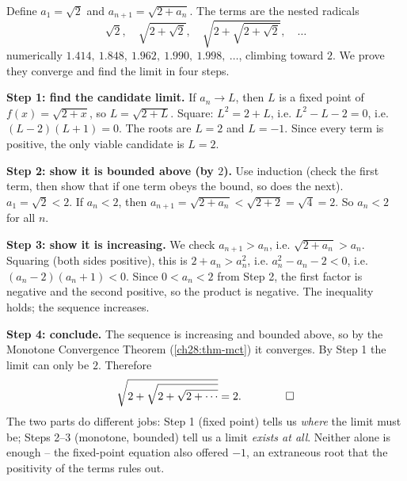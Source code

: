 \begin{example}[A recursion that converges: $a_{n+1} = \sqrt{2 + a_n}$]
\label{ch28:ex-nested-radical}
Define $a_1 = \sqrt2$ and $a_{n+1} = \sqrt{2 + a_n}$. The terms are the nested
radicals
\[
  \sqrt2,\quad \sqrt{2 + \sqrt2},\quad \sqrt{2 + \sqrt{2 + \sqrt2}},\quad \dots
\]
numerically $1.414,\ 1.848,\ 1.962,\ 1.990,\ 1.998,\ \dots$, climbing
toward $2$. We prove they converge and find the limit in four steps.

\textbf{Step 1: find the candidate limit.} If $a_n \to L$, then $L$ is a fixed
point of $f(x) = \sqrt{2 + x}$, so $L = \sqrt{2 + L}$. Square: $L^2 = 2 + L$, i.e.
$L^2 - L - 2 = 0$, i.e. $(L-2)(L+1) = 0$. The roots are $L = 2$ and $L = -1$.
Since every term is positive, the only viable candidate is $L = 2$.

\textbf{Step 2: show it is bounded above (by $2$).} Use induction (check the
first term, then show that if one term obeys the bound, so does the next). $a_1 =
\sqrt2 < 2$. If $a_n < 2$, then $a_{n+1} = \sqrt{2 + a_n} < \sqrt{2 + 2} =
\sqrt4 = 2$. So $a_n < 2$ for all $n$.

\textbf{Step 3: show it is increasing.} We check $a_{n+1} > a_n$, i.e. $\sqrt{2 +
a_n} > a_n$. Squaring (both sides positive), this is $2 + a_n > a_n^2$, i.e.
$a_n^2 - a_n - 2 < 0$, i.e. $(a_n - 2)(a_n + 1) < 0$. Since $0 < a_n < 2$ from
Step 2, the first factor is negative and the second positive, so the product is
negative. The inequality holds; the sequence increases.

\textbf{Step 4: conclude.} The sequence is increasing and bounded above, so by
the Monotone Convergence Theorem (\ref{ch28:thm-mct}) it converges. By Step 1 the
limit can only be $2$. Therefore
\[
  \sqrt{2 + \sqrt{2 + \sqrt{2 + \cdots}}} = 2. \qquad\qed
\]
The two parts do different jobs: Step 1 (fixed point) tells us \emph{where} the
limit must be; Steps 2--3 (monotone, bounded) tell us a limit \emph{exists at
all}. Neither alone is enough -- the fixed-point equation also offered $-1$,
an extraneous root that the positivity of the terms rules out.
\end{example}


